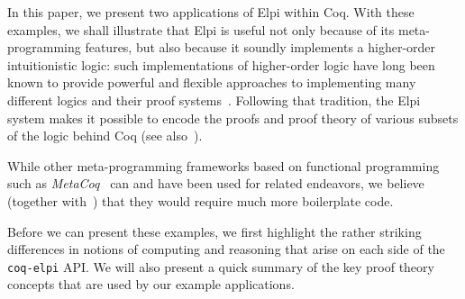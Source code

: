 In this paper, we present two applications of Elpi within Coq. With
these examples, we shall illustrate that Elpi is useful not only
because of its meta-programming features, but also because it soundly
implements a higher-order intuitionistic logic: such implementations
of higher-order logic have long been known to provide powerful and
flexible approaches to implementing many different logics and their
proof systems~\cite{felty89phd,felty88cade,paulson89jar}.  Following
that tradition, the Elpi system makes it possible to encode the proofs
and proof theory of various subsets of the logic behind Coq (see also~\cite{felty93lics}). 

While other meta-programming frameworks based on functional
programming such as \emph{MetaCoq}~\cite{sozeau2020metacoq} can and
have been used for related endeavors, we believe (together
with~\cite{DunchevCT16}) that they would require much more
boilerplate code.

Before we can present these examples, we first highlight the rather
striking differences in notions of computing and reasoning that arise
on each side of the \texttt{coq-elpi} API.   We will also present a quick
summary of the key proof theory concepts that are used by our example
applications.


